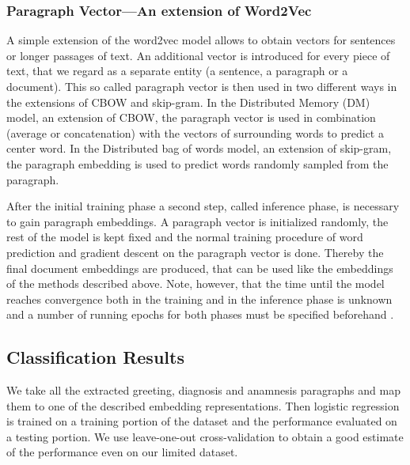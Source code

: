 \subsubsection*{Paragraph Vector---An extension of Word2Vec}

A simple extension of the word2vec model allows to obtain vectors
for sentences or longer passages of text. An additional vector is
introduced for every piece of text, that we regard as a separate entity
(a sentence, a paragraph or a document). This so called paragraph
vector is then used in two different ways in the extensions of CBOW
and skip-gram. In the Distributed Memory (DM) model, an extension
of CBOW, the paragraph vector is used in combination (average or concatenation)
with the vectors of surrounding words to predict a center word. In
the Distributed bag of words model, an extension of skip-gram, the
paragraph embedding is used to predict words randomly sampled from
the paragraph.

After the initial training phase a second step, called inference phase, is necessary to gain paragraph embeddings. A paragraph vector is initialized randomly, the rest of the model is kept fixed and the normal training procedure of word prediction and gradient descent on the paragraph vector is done. Thereby the final document embeddings are produced, that can be used like the embeddings of the methods described above. Note, however, that the time until the model reaches convergence both in the training and in the inference phase is unknown and a number of running epochs for both phases must be specified beforehand \citep{Le2014}.





\subsection*{Classification Results}

We take all the extracted greeting, diagnosis and anamnesis paragraphs and map them to one of the described embedding representations. Then logistic regression is trained on a training portion of the dataset and the performance evaluated on a testing portion. We use leave-one-out cross-validation to obtain a good estimate of the performance even on our limited dataset.

